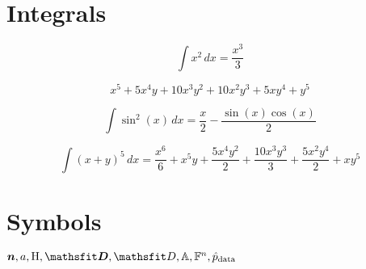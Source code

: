 \documentclass[12pt]{article}
\begin{document}
    \section{Integrals}\label{sec:integrals}

    \begin{equation}
        \int x^{2}\, dx = \frac{x^{3}}{3}
    \end{equation}

    \begin{equation}
        x^{5} + 5 x^{4} y + 10 x^{3} y^{2} + 10 x^{2} y^{3} + 5 x y^{4} + y^{5}
    \end{equation}

    \begin{equation}
        \int \sin^{2}{\left(x \right)}\, dx = \frac{x}{2} - \frac{\sin{\left(x \right)} \cos{\left(x \right)}}{2}
    \end{equation}

    \begin{equation}
        \int \left(x + y\right)^{5}\, dx = \frac{x^{6}}{6} + x^{5} y + \frac{5 x^{4} y^{2}}{2} + \frac{10 x^{3} y^{3}}{3} + \frac{5 x^{2} y^{4}}{2} + x y^{5}
    \end{equation}


    \section{Symbols}\label{sec:symbols}
    \begin{math}
        \vn, \eva, \ermH, \tD, \etD, \sA, \sF^{n}, \ptrain
    \end{math}
\end{document}
